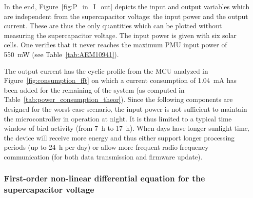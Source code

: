 \documentclass{EPL-master-thesis-covers-EN}
\begin{document}
In the end, Figure~\ref{fig:P_in_I_out} depicts the input and output variables which are independent from the supercapacitor voltage: the input power and the output current. These are thus the only quantities which can be plotted without measuring the supercapacitor voltage.
The input power is given with six solar cells. One verifies that it never reaches the maximum PMU input power of \SI{550}{mW} (see Table~\ref{tab:AEM10941}).

The output current has the cyclic profile from the MCU analyzed in Figure~\ref{fig:consumption_fft} on which a current consumption of \SI{1.04}{mA} has been added for the remaining of the system (as computed in Table~\ref{tab:power_consumption_theor}). Since the following components are designed for the worst-case scenario, the input power is not sufficient to maintain the microcontroller in operation at night. It is thus limited to a typical time window of bird activity (from \SI{7}{h} to \SI{17}{h}). When days have longer sunlight time, the device will receive more energy and thus either support longer processing periods (up to \SI{24}{h} per day) or allow more frequent radio-frequency communication (for both data transmission and firmware update).

\subsubsection*{First-order non-linear differential equation for the supercapacitor voltage}
\end{document}
